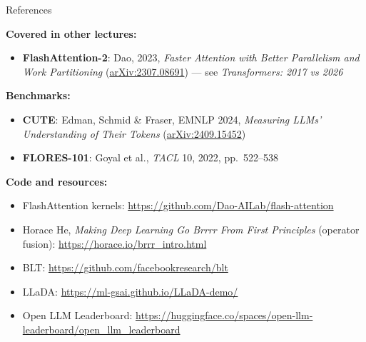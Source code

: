 \begin{frame}[allowframebreaks]{References}
\framebreak

    \textbf{Covered in other lectures:}
    \begin{itemize}
        \item \textbf{FlashAttention-2}: Dao, 2023, \emph{Faster Attention with Better Parallelism and Work Partitioning} (\href{https://arxiv.org/abs/2307.08691}{arXiv:2307.08691}) --- see \emph{Transformers: 2017 vs 2026}
    \end{itemize}
\framebreak
    \textbf{Benchmarks:}
    \begin{itemize}
        \item \textbf{CUTE}: Edman, Schmid \& Fraser, EMNLP 2024, \emph{Measuring LLMs' Understanding of Their Tokens} (\href{https://arxiv.org/abs/2409.15452}{arXiv:2409.15452})
        \item \textbf{FLORES-101}: Goyal et al., \emph{TACL} 10, 2022, pp.~522--538
    \end{itemize}
    \vspace{0.5em}
    \textbf{Code and resources:}
    \begin{itemize}
        \item FlashAttention kernels: \url{https://github.com/Dao-AILab/flash-attention}
        \item Horace He, \emph{Making Deep Learning Go Brrrr From First Principles} (operator fusion): \url{https://horace.io/brrr_intro.html}
        \item BLT: \url{https://github.com/facebookresearch/blt}
        \item LLaDA: \url{https://ml-gsai.github.io/LLaDA-demo/}
        \item Open LLM Leaderboard: \url{https://huggingface.co/spaces/open-llm-leaderboard/open_llm_leaderboard}
    \end{itemize}
\end{frame}
